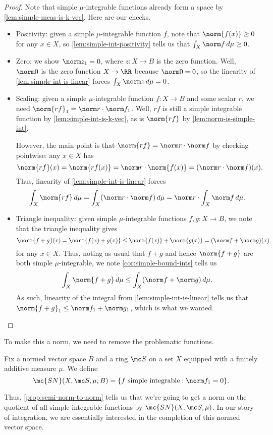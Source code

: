 \documentclass[../notes.tex]{subfiles}
\begin{document}
\begin{proof}
	Note that simple $\mu$-integrable functions already form a space by \autoref{lem:simple-meas-is-k-vec}. Here are our checks.
	\begin{itemize}
		\item Positivity: given a simple $\mu$-integrable function $f$, note that $\norm{f(x)}\ge0$ for any $x\in X$, so \autoref{lem:simple-int-positivity} tells us that $\int_X\norm f\,d\mu\ge0$.
		\item Zero: we show $\norm z_1=0$, where $z\colon X\to B$ is the zero function. Well, $\norm0$ is the zero function $X\to\RR$ because $\norm0=0$, so the linearity of \autoref{lem:simple-int-is-linear} forces $\int_X\norm z\,d\mu=0$.
		\item Scaling: given a simple $\mu$-integrable function $f\colon X\to B$ and some scalar $r$, we need $\norm{rf}_1=\norm r\cdot\norm f_1$. Well, $rf$ is still a simple integrable function by \autoref{lem:simple-int-is-k-vec}, as is $\norm{rf}$ by \autoref{lem:norm-is-simple-int}.

		However, the main point is that $\norm{rf}=\norm r\cdot\norm f$ by checking pointwise: any $x\in X$ has
		\[\norm{rf}(x)=\norm{rf(x)}=\norm r\cdot\norm{f(x)}=(\norm r\cdot\norm f)(x).\]
		Thus, linearity of \autoref{lem:simple-int-is-linear} forces
		\[\int_X\norm{rf}\,d\mu=\int_X(\norm r\cdot\norm f)\,d\mu=\norm r\cdot\int_X\norm f\,d\mu.\]
		\item Triangle inequality: given simple $\mu$-integrable functions $f,g\colon X\to B$, we note that the triangle inequality gives
		\[\norm{f+g}(x)=\norm{f(x)+g(x)}\le\norm{f(x)}+\norm{g(x)}=(\norm f+\norm g)(x)\]
		for any $x\in X$. Thus, noting as usual that $f+g$ and hence $\norm{f+g}$ are both simple $\mu$-integrable, we note \autoref{cor:simple-bound-ints} tells us
		\[\int_X\norm{f+g}\,d\mu\le\int_X(\norm f+\norm g)\,d\mu.\]
		As such, linearity of the integral from \autoref{lem:simple-int-is-linear} tells us that $\norm{f+g}_1\le\norm f_1+\norm g_1$, which is what we wanted.
		\qedhere
	\end{itemize}
\end{proof}
To make this a norm, we need to remove the problematic functions.
\begin{notation}
	Fix a normed vector space $B$ and a ring $\mc S$ on a set $X$ equipped with a finitely additive measure $\mu$. We define
	\[\mc{SN}(X,\mc S,\mu,B)=\{f\text{ simple integrable}:\norm f_1=0\}.\]
\end{notation}
Thus, \autoref{prop:semi-norm-to-norm} tells us that we're going to get a norm on the quotient of all simple integrable functions by $\mc {SN}(X,\mc S,\mu)$. In our story of integration, we are essentially interested in the completion of this normed vector space.
\end{document}
